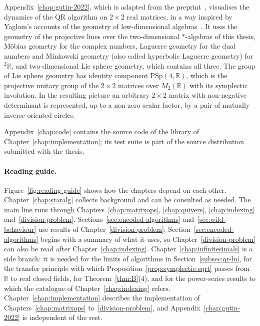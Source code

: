 \documentclass[12pt, a4paper]{report}
\theoremstyle{plain}
\theoremstyle{definition}
\theoremstyle{remark}
\theoremstyle{plain}
\newcommand{\RR}{\mathbb{R}}
\newcommand{\twoR}{{}^{2}\mathbb{R}}
\begin{document}
Appendix~\ref{chap:gutin-2022}, which is adapted from the preprint~\cite{Gutin2022Visualisation}, visualises the dynamics of the QR algorithm on $2\times 2$ real matrices, in a way inspired by Yaglom's accounts of the geometry of low-dimensional algebras~\cite{Yaglom1968-ComplexNumbers,Yaglom1979-SimpleNonEuclid}. It uses the geometry of the projective lines over the two-dimensional $*$-algebras of this thesis, M\"obius geometry for the complex numbers, Laguerre geometry for the dual numbers and Minkowski geometry (also called hyperbolic Laguerre geometry) for $\twoR$, and two-dimensional Lie sphere geometry, which contains all three. The group of Lie sphere geometry has identity component $\mathrm{PSp}(4,\RR)$, which is the projective unitary group of the $2\times2$ matrices over $M_2(\RR)$ with its symplectic involution. In the resulting picture an arbitrary $2\times 2$ matrix with non-negative determinant is represented, up to a non-zero scalar factor, by a pair of mutually inverse oriented circles.

Appendix~\ref{chap:code} contains the source code of the library of Chapter~\ref{chap:implementation}; its test suite is part of the source distribution submitted with the thesis.

\paragraph{Reading guide.} Figure~\ref{fig:reading-guide} shows how the chapters depend on each other. Chapter~\ref{chap:staralg} collects background and can be consulted as needed. The main line runs through Chapters~\ref{chap:matrixops}, \ref{chap:quivers}, \ref{chap:indexing} and~\ref{division-problem}. Sections~\ref{sec:encoded-algorithms} and~\ref{sec:wild-behaviour} use results of Chapter~\ref{division-problem}; Section~\ref{sec:encoded-algorithms} begins with a summary of what it uses, so Chapter~\ref{division-problem} can also be read after Chapter~\ref{chap:indexing}. Chapter~\ref{chap:infinitesimals} is a side branch: it is needed for the limits of algorithms in Section~\ref{subsec:qr-lu}, for the transfer principle with which Proposition~\ref{prop:symplectic-sqrt} passes from $\RR$ to real closed fields, for Theorem~\ref{thm:B}(4), and for the power-series results to which the catalogue of Chapter~\ref{chap:indexing} refers. Chapter~\ref{chap:implementation} describes the implementation of Chapters~\ref{chap:matrixops} to~\ref{division-problem}, and Appendix~\ref{chap:gutin-2022} is independent of the rest.
\end{document}
